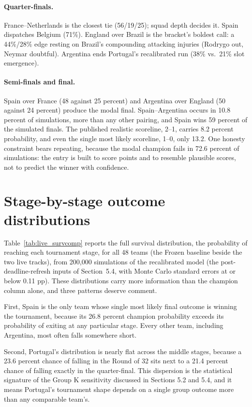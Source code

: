 \documentclass[11pt,letterpaper]{article}
\begin{document}
\paragraph{Quarter-finals.} France--Netherlands is the closest tie (56/19/25); squad depth decides it. Spain dispatches Belgium (71\%). England over Brazil is the bracket's boldest call: a 44\%/28\% edge resting on Brazil's compounding attacking injuries (Rodrygo out, Neymar doubtful). Argentina ends Portugal's recalibrated run (38\% vs.\ 21\% slot emergence).

\paragraph{Semi-finals and final.} Spain over France (48 against 25 percent) and Argentina over England (50 against 24 percent) produce the modal final. Spain--Argentina occurs in 10.8 percent of simulations, more than any other pairing, and Spain wins 59 percent of the simulated finals. The published realistic scoreline, 2--1, carries 8.2 percent probability, and even the single most likely scoreline, 1--0, only 13.2. One honesty constraint bears repeating, because the modal champion fails in 72.6 percent of simulations: the entry is built to score points and to resemble plausible scores, not to predict the winner with confidence.

\section{Stage-by-stage outcome distributions}\label{app:survival}

Table~\ref{tab:live_survcomp} reports the full survival distribution, the probability of reaching each tournament stage, for all 48 teams (the Frozen baseline beside the two live tracks), from 200{,}000 simulations of the recalibrated model (the post-deadline-refresh inputs of Section~5.4, with Monte Carlo standard errors at or below 0.11 pp). These distributions carry more information than the champion column alone, and three patterns deserve comment.

First, Spain is the only team whose single most likely final outcome is winning the tournament, because its 26.8 percent champion probability exceeds its probability of exiting at any particular stage. Every other team, including Argentina, most often falls somewhere short.

Second, Portugal's distribution is nearly flat across the middle stages, because a 23.6 percent chance of falling in the Round of 32 sits next to a 21.4 percent chance of falling exactly in the quarter-final. This dispersion is the statistical signature of the Group K sensitivity discussed in Sections 5.2 and 5.4, and it means Portugal's tournament shape depends on a single group outcome more than any comparable team's.
\end{document}
